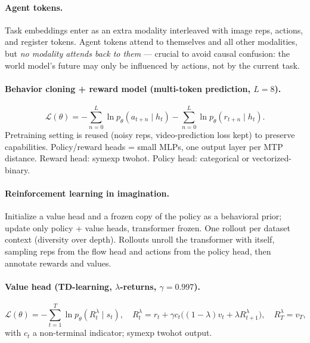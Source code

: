 \documentclass[11pt]{article}
\begin{document}
\paragraph{Agent tokens.}
Task embeddings enter as an extra modality interleaved with image reps, actions, and
register tokens. Agent tokens attend to themselves and all other modalities, but
\emph{no modality attends back to them} --- crucial to avoid causal confusion: the
world model's future may only be influenced by actions, not by the current task.

\paragraph{Behavior cloning + reward model (multi-token prediction, $L=8$).}
\begin{equation}
  \mathcal{L}(\theta) = -\sum_{n=0}^{L}\ln p_\theta(a_{t+n}\mid h_t)
                        -\sum_{n=0}^{L}\ln p_\theta(r_{t+n}\mid h_t).
\end{equation}
Pretraining setting is reused (noisy reps, video-prediction loss kept) to preserve
capabilities. Policy/reward heads = small MLPs, one output layer per MTP distance.
Reward head: symexp twohot. Policy head: categorical or vectorized-binary.

\paragraph{Reinforcement learning in imagination.}
Initialize a value head and a frozen copy of the policy as a behavioral prior; update
only policy + value heads, transformer frozen. One rollout per dataset context
(diversity over depth). Rollouts unroll the transformer with itself, sampling reps from
the flow head and actions from the policy head, then annotate rewards and values.

\paragraph{Value head (TD-learning, $\lambda$-returns, $\gamma=0.997$).}
\begin{equation}
  \mathcal{L}(\theta) = -\sum_{t=1}^{T}\ln p_\theta(R_t^\lambda \mid s_t),
  \quad
  R_t^\lambda = r_t + \gamma c_t\big((1-\lambda)v_t + \lambda R_{t+1}^\lambda\big),
  \quad
  R_T^\lambda = v_T,
\end{equation}
with $c_t$ a non-terminal indicator; symexp twohot output.
\end{document}
